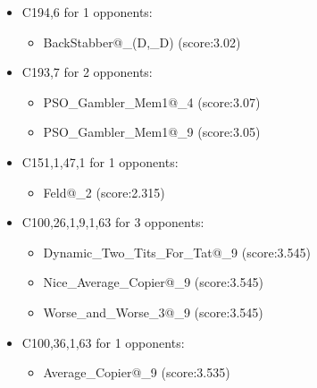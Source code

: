 \begin{appendices}
\begin{itemize}
        \item C194,6 for 1 opponents:
        \begin{multicols}{3}
            \begin{itemize}
                \item BackStabber@\_(D,\_D) (score:3.02)
            \end{itemize}
        \end{multicols}

        \item C193,7 for 2 opponents:
        \begin{multicols}{3}
            \begin{itemize}
                \item PSO\_Gambler\_Mem1@\_4 (score:3.07)
                \item PSO\_Gambler\_Mem1@\_9 (score:3.05)
            \end{itemize}
        \end{multicols}

        \item C151,1,47,1 for 1 opponents:
        \begin{multicols}{3}
            \begin{itemize}
                \item Feld@\_2 (score:2.315)
            \end{itemize}
        \end{multicols}

        \item C100,26,1,9,1,63 for 3 opponents:
        \begin{multicols}{3}
            \begin{itemize}
                \item Dynamic\_Two\_Tits\_For\_Tat@\_9 (score:3.545)
                \item Nice\_Average\_Copier@\_9 (score:3.545)
                \item Worse\_and\_Worse\_3@\_9 (score:3.545)
            \end{itemize}
        \end{multicols}

        \item C100,36,1,63 for 1 opponents:
        \begin{multicols}{3}
            \begin{itemize}
                \item Average\_Copier@\_9 (score:3.535)
            \end{itemize}
        \end{multicols}


\end{itemize}
\end{appendices}
